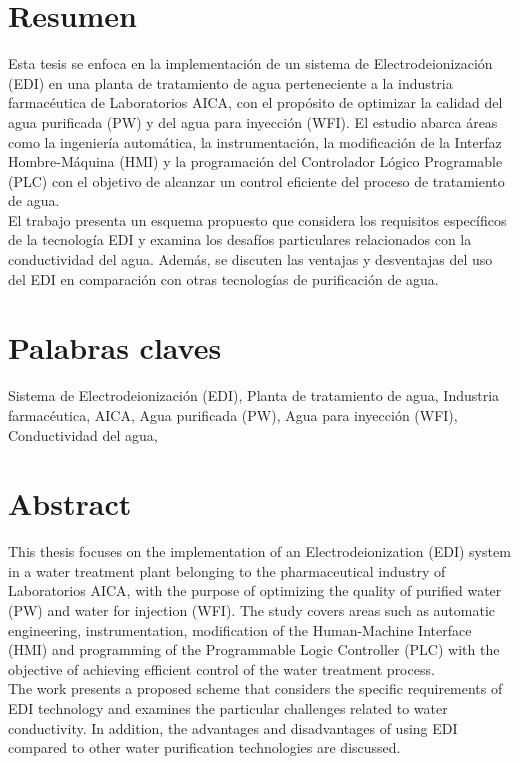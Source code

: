 \documentclass[
	spanish, %
	letterpaper, oneside
]{book}
\begin{document}
\templatePortrait

\templatePagecfg

\newcommand{\keywords}[1]{\par\noindent #1}
\newcommand{\abstracttext}[1]{\par #1}

\newpage
\section*{Resumen}
\abstracttext{Esta tesis se enfoca en la implementación de un sistema de Electrodeionización (EDI) en una planta de tratamiento de agua perteneciente a la industria farmacéutica de Laboratorios AICA, con el propósito de optimizar la calidad del agua purificada (PW) y del agua para inyección (WFI). El estudio abarca áreas como la ingeniería automática, la instrumentación, la modificación de la Interfaz Hombre-Máquina (HMI) y la programación del Controlador Lógico Programable (PLC) con el objetivo de alcanzar un control eficiente del proceso de tratamiento de agua.\\

	El trabajo presenta un esquema propuesto que considera los requisitos específicos de la tecnología EDI y examina los desafíos particulares relacionados con la conductividad del agua. Además, se discuten las ventajas y desventajas del uso del EDI en comparación con otras tecnologías de purificación de agua.\\}

\section*{Palabras claves}
\keywords{Sistema de Electrodeionización (EDI), Planta de tratamiento de agua, Industria farmacéutica, AICA, Agua purificada (PW), Agua para inyección (WFI), Conductividad del agua,  }

\newpage
\section*{Abstract}
\abstracttext{This thesis focuses on the implementation of an Electrodeionization (EDI) system in a water treatment plant belonging to the pharmaceutical industry of Laboratorios AICA, with the purpose of optimizing the quality of purified water (PW) and water for injection (WFI). The study covers areas such as automatic engineering, instrumentation, modification of the Human-Machine Interface (HMI) and programming of the Programmable Logic Controller (PLC) with the objective of achieving efficient control of the water treatment process.\\

	The work presents a proposed scheme that considers the specific requirements of EDI technology and examines the particular challenges related to water conductivity. In addition, the advantages and disadvantages of using EDI compared to other water purification technologies are discussed.\\}
\end{document}
